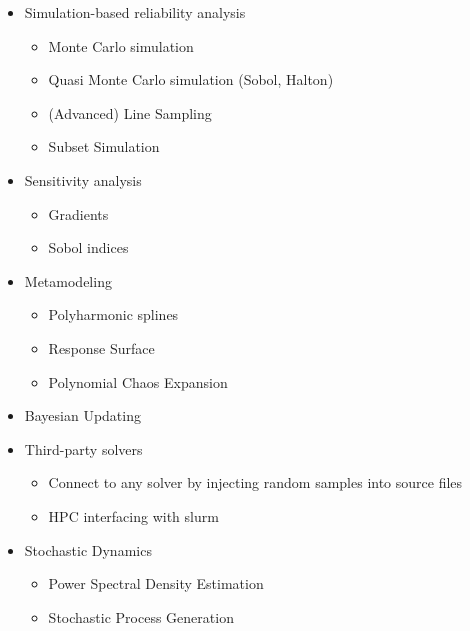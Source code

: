 \begin{itemize}
\item Simulation-based reliability analysis

\begin{itemize}
\item Monte Carlo simulation


\item Quasi Monte Carlo simulation (Sobol, Halton)


\item (Advanced) Line Sampling


\item Subset Simulation

\end{itemize}

\item Sensitivity analysis

\begin{itemize}
\item Gradients


\item Sobol indices

\end{itemize}

\item Metamodeling

\begin{itemize}
\item Polyharmonic splines


\item Response Surface


\item Polynomial Chaos Expansion

\end{itemize}

\item Bayesian Updating


\item Third-party solvers

\begin{itemize}
\item Connect to any solver by injecting random samples into source files


\item HPC interfacing with slurm

\end{itemize}

\item Stochastic Dynamics

\begin{itemize}
\item Power Spectral Density Estimation


\item Stochastic Process Generation

\end{itemize}
\end{itemize}


